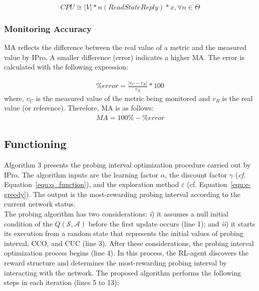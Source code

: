 {\setlength{\mathindent}{3cm}
\begin{equation}
    CPU \cong \left | V \right |* n\left ( ReadStateReply \right ) * x,  \forall n \in \Theta
     \label{equ:load_cpu}
\end{equation}
}
\subsubsection{Monitoring Accuracy} 
MA reflects the difference between the real value of a metric and the measured value by IPro. A smaller difference (error) indicates a higher MA. The error is calculated with the following expression:

{\setlength{\mathindent}{5cm}
\begin{equation}
    \begin{split}
        \%error = \frac{\left | v_{C}-v_{R} \right |}{v_{R}}*100
    \end{split}
     \label{equ:percent-error}
\end{equation}
}
where, $v_{C}$ is the measured value of the metric being monitored and $v_{R}$ is the real value (or reference). Therefore, MA is as follows:
{\setlength{\mathindent}{5cm}
\begin{equation}
    \begin{split}
        MA = 100\% - \%error
    \end{split}
     \label{equ:ma}
\end{equation}
}

\subsection{Functioning}
\label{subsec:assumptions}

Algorithm 3 presents the probing interval optimization procedure carried out by IPro. The algorithm inputs are the learning factor $\alpha$, the discount factor $\gamma$ (\textit{cf.} Equation~\ref{equ:q_function}), and the exploration method $\varepsilon$ (cf. Equation~\ref{equ:e-greedy}). The output is the most-rewarding probing interval according to the current network status.\\

The probing algorithm has two considerations: \textit{i}) it assumes a null initial condition of the $Q(\mathcal{S},\mathcal{A})$ before the first update occurs (line 1); and \textit{ii}) it starts its execution from a random state that represents the initial values of probing interval, CCO, and CUC (line 3). After these considerations, the probing interval optimization process begins (line 4). In this process, the RL-agent discovers the reward structure and determines the most-rewarding probing interval by interacting with the network. The proposed algorithm performs the following steps in each iteration (lines 5 to 13):

